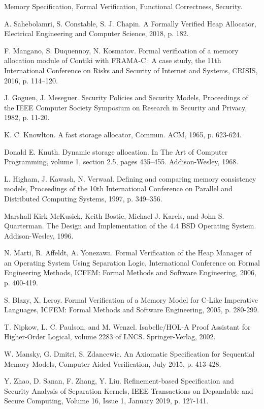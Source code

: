 \documentclass[10pt,conference,compsoc]{IEEEtran}
\begin{document}
\begin{IEEEkeywords}
Memory Specification, Formal Verification, Functional Correctness, Security.
\end{IEEEkeywords}





%

\begin{thebibliography}{00}
	A. Sahebolamri, S. Constable, S. J. Chapin. A Formally Verified Heap Allocator, Electrical Engineering and Computer Science, 2018, p. 182.
	
	F. Mangano, S. Duquennoy, N. Kosmatov. Formal verification of a memory allocation module of Contiki with FRAMA-C : A case study, the 11th International Conference on Risks and Security of Internet and Systems, CRISIS, 2016, p. 114–120.
	
	J. Goguen, J. Meseguer. Security Policies and Security Models, Proceedings of the IEEE Computer Society Symposium on Research in Security and Privacy, 1982, p. 11-20.
	
	K. C. Knowlton. A fast storage allocator, Commun. ACM, 1965, p. 623-624.
	
	Donald E. Knuth. Dynamic storage allocation. In The Art of Computer Programming, volume 1, section 2.5, pages 435–455. Addison-Wesley, 1968.
	
	L. Higham, J. Kawash, N. Verwaal. Defining and comparing memory consistency
	models, Proceedings of the 10th International Conference on Parallel and Distributed Computing Systems, 1997, p. 349–356.
	
	Marshall Kirk McKusick, Keith Bostic, Michael J. Karels, and John S. Quarterman. The Design and Implementation of the 4.4 BSD Operating System. Addison-Wesley, 1996.
	
	N. Marti, R. Affeldt, A. Yonezawa. Formal Verification of the Heap Manager of an Operating System Using Separation Logic, International Conference on Formal Engineering Methods, ICFEM: Formal Methods and Software Engineering, 2006, p. 400-419.
	
	S. Blazy, X. Leroy. Formal Verification of a Memory Model for C-Like Imperative Languages, ICFEM: Formal Methods and Software Engineering, 2005, p. 280-299.
	
	T. Nipkow, L. C. Paulson, and M. Wenzel. Isabelle/HOL-A Proof Assistant for Higher-Order Logical, volume 2283 of LNCS. Springer-Verlag, 2002.
	
	W. Mansky, G. Dmitri, S. Zdancewic. An Axiomatic Specification for Sequential Memory Models, Computer Aided Verification, July 2015, p. 413-428.
	
	Y. Zhao, D. Sanan, F. Zhang, Y. Liu. Refinement-based Specification and Security Analysis of Separation Kernels, IEEE Transactions on Depandable and Secure Computing, Volume 16, Issue 1, January 2019, p. 127-141.
\end{thebibliography}
\end{document}
